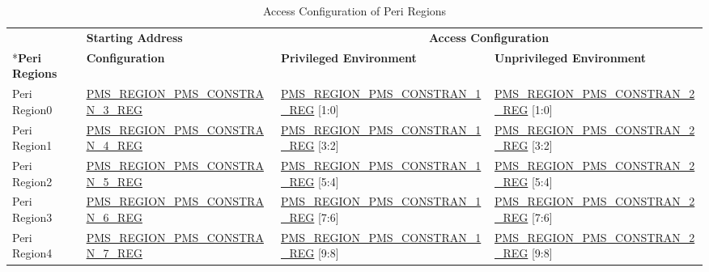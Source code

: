 \documentclass[main\_\_EN.tex]{subfiles}
\begin{document}
\begin{table}[H]
    \centering
    \caption{Access Configuration of Peri Regions}
    \label{tab:perpheral_region_config}
    \begin{threeparttable}
    \begin{tabular}{ | l | l | l | l |}
    \hline
        \rowcolor{lightgray}
         & \textbf{Starting Address} & \multicolumn{2}{c|}{\textbf{Access Configuration}} \\\cline{3-4}
        \rowcolor{lightgray}
        \multirow{-2}*{\textbf{Peri Regions}} & \textbf{Configuration} & \textbf{Privileged Environment} & \textbf{Unprivileged Environment} \\\hline
        Peri Region0 & \scriptsize{\hyperref[regdesc:PMSREGIONPMSCONSTRAIN3REG]{PMS\_REGION\_PMS\_CONSTRAN\_3\_REG}} & \scriptsize{\hyperref[regdesc:PMSREGIONPMSCONSTRAIN1REG]{\hyperref[regdesc:PMSREGIONPMSCONSTRAIN1REG]{PMS\_REGION\_PMS\_CONSTRAN\_1\_REG}} [1:0]} & \scriptsize{\hyperref[regdesc:PMSREGIONPMSCONSTRAIN1REG]{PMS\_REGION\_PMS\_CONSTRAN\_2\_REG} [1:0]}\\\hline
        Peri Region1 & \scriptsize{\hyperref[regdesc:PMSREGIONPMSCONSTRAIN3REG]{PMS\_REGION\_PMS\_CONSTRAN\_4\_REG}} & \scriptsize{\hyperref[regdesc:PMSREGIONPMSCONSTRAIN1REG]{PMS\_REGION\_PMS\_CONSTRAN\_1\_REG} [3:2]} & \scriptsize{\hyperref[regdesc:PMSREGIONPMSCONSTRAIN1REG]{PMS\_REGION\_PMS\_CONSTRAN\_2\_REG} [3:2]}\\\hline
        Peri Region2 & \scriptsize{\hyperref[regdesc:PMSREGIONPMSCONSTRAIN3REG]{PMS\_REGION\_PMS\_CONSTRAN\_5\_REG}} & \scriptsize{\hyperref[regdesc:PMSREGIONPMSCONSTRAIN1REG]{PMS\_REGION\_PMS\_CONSTRAN\_1\_REG} [5:4]} & \scriptsize{\hyperref[regdesc:PMSREGIONPMSCONSTRAIN1REG]{PMS\_REGION\_PMS\_CONSTRAN\_2\_REG} [5:4]}\\\hline
        Peri Region3 & \scriptsize{\hyperref[regdesc:PMSREGIONPMSCONSTRAIN3REG]{PMS\_REGION\_PMS\_CONSTRAN\_6\_REG}} & \scriptsize{\hyperref[regdesc:PMSREGIONPMSCONSTRAIN1REG]{PMS\_REGION\_PMS\_CONSTRAN\_1\_REG} [7:6]} & \scriptsize{\hyperref[regdesc:PMSREGIONPMSCONSTRAIN1REG]{PMS\_REGION\_PMS\_CONSTRAN\_2\_REG} [7:6]}\\\hline
        Peri Region4 & \scriptsize{\hyperref[regdesc:PMSREGIONPMSCONSTRAIN3REG]{PMS\_REGION\_PMS\_CONSTRAN\_7\_REG}} & \scriptsize{\hyperref[regdesc:PMSREGIONPMSCONSTRAIN1REG]{PMS\_REGION\_PMS\_CONSTRAN\_1\_REG} [9:8]} & \scriptsize{\hyperref[regdesc:PMSREGIONPMSCONSTRAIN1REG]{PMS\_REGION\_PMS\_CONSTRAN\_2\_REG} [9:8]}\\\hline

\end{tabular}
\end{threeparttable}
\end{table}
\end{document}
